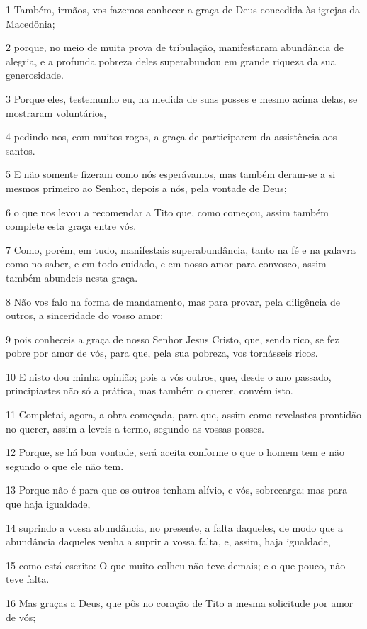 \par 1 Também, irmãos, vos fazemos conhecer a graça de Deus concedida às igrejas da Macedônia;
\par 2 porque, no meio de muita prova de tribulação, manifestaram abundância de alegria, e a profunda pobreza deles superabundou em grande riqueza da sua generosidade.
\par 3 Porque eles, testemunho eu, na medida de suas posses e mesmo acima delas, se mostraram voluntários,
\par 4 pedindo-nos, com muitos rogos, a graça de participarem da assistência aos santos.
\par 5 E não somente fizeram como nós esperávamos, mas também deram-se a si mesmos primeiro ao Senhor, depois a nós, pela vontade de Deus;
\par 6 o que nos levou a recomendar a Tito que, como começou, assim também complete esta graça entre vós.
\par 7 Como, porém, em tudo, manifestais superabundância, tanto na fé e na palavra como no saber, e em todo cuidado, e em nosso amor para convosco, assim também abundeis nesta graça.
\par 8 Não vos falo na forma de mandamento, mas para provar, pela diligência de outros, a sinceridade do vosso amor;
\par 9 pois conheceis a graça de nosso Senhor Jesus Cristo, que, sendo rico, se fez pobre por amor de vós, para que, pela sua pobreza, vos tornásseis ricos.
\par 10 E nisto dou minha opinião; pois a vós outros, que, desde o ano passado, principiastes não só a prática, mas também o querer, convém isto.
\par 11 Completai, agora, a obra começada, para que, assim como revelastes prontidão no querer, assim a leveis a termo, segundo as vossas posses.
\par 12 Porque, se há boa vontade, será aceita conforme o que o homem tem e não segundo o que ele não tem.
\par 13 Porque não é para que os outros tenham alívio, e vós, sobrecarga; mas para que haja igualdade,
\par 14 suprindo a vossa abundância, no presente, a falta daqueles, de modo que a abundância daqueles venha a suprir a vossa falta, e, assim, haja igualdade,
\par 15 como está escrito: O que muito colheu não teve demais; e o que pouco, não teve falta.
\par 16 Mas graças a Deus, que pôs no coração de Tito a mesma solicitude por amor de vós;
